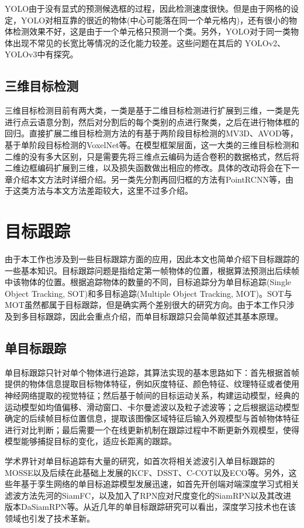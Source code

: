 YOLO由于没有显式的预测候选框的过程，因此检测速度很快。但是由于网格的设定，YOLO对相互靠的很近的物体(中心可能落在同一个单元格内)，还有很小的物体检测效果不好，这是由于一个单元格只预测一个类。另外，YOLO对于同一类物体出现不常见的长宽比等情况的泛化能力较差。这些问题在其后的 YOLOv2、YOLOv3中有探究。

\subsection{三维目标检测}
\label{3d_detection}
三维目标检测目前有两大类，一类是基于二维目标检测进行扩展到三维，一类是先进行点云语意分割，然后对分割后的每个类别的点进行聚类，之后在进行物体框的回归。直接扩展二维目标检测方法的有基于两阶段目标检测的MV3D、AVOD等，基于单阶段目标检测的VoxelNet等。在模型框架层面，这一大类的三维目标检测和二维的没有多大区别，只是需要先将三维点云编码为适合卷积的数据格式，然后将二维边框编码扩展到三维，以及损失函数做出相应的修改。具体的改动将会在下一章介绍本文方法时详细介绍。另一类先分割再回归框的方法有PointRCNN等，由于这类方法与本文方法差距较大，这里不过多介绍。


\section{目标跟踪}
\label{object_tracking}
由于本工作也涉及到一些目标跟踪方面的应用，因此本文也简单介绍下目标跟踪的一些基本知识。目标跟踪问题是指给定第一帧物体的位置，根据算法预测出后续帧中该物体的位置。根据追踪物体的数量的不同，目标追踪分为单目标追踪(Single Object Tracking, SOT)和多目标追踪(Multiple Object Tracking, MOT)。SOT与MOT虽然都属于目标跟踪，但是确实两个差别很大的研究方向。由于本工作只涉及到多目标跟踪，因此会重点介绍，而单目标跟踪只会简单叙述其基本原理。

\subsection{单目标跟踪}
\label{single_tracking}
单目标跟踪只针对单个物体进行追踪，其算法实现的基本思路如下：首先根据首帧提供的物体信息提取目标物体特征，例如灰度特征、颜色特征、纹理特征或者使用神经网络提取的视觉特征；然后基于帧间的目标运动关系，构建运动模型，经典的运动模型如均值偏移、滑动窗口、卡尔曼滤波以及粒子滤波等；之后根据运动模型确定的后续帧目标位置信息，提取该图像区域特征后输入外观模型与首帧物体特征进行对比判断；最后需要一个在线更新机制在跟踪过程中不断更新外观模型，使得模型能够捕捉目标的变化，适应长距离的跟踪。

学术界针对单目标追踪有大量的研究，如首次将相关滤波引入单目标跟踪的MOSSE\cite{bolme2010visual}以及后续在此基础上发展的KCF\cite{henriques2014high}、DSST\cite{danelljan2014accurate}、C-COT\cite{danelljan2016beyond}以及ECO\cite{danelljan2017eco}等。另外，这些年基于孪生网络的单目标追踪模型发展迅速，如首先开创端对端深度学习式相关滤波方法先河的SiamFC\cite{bertinetto2016fully}，以及加入了RPN应对尺度变化的SiamRPN\cite{li2018high}以及其改进版本DaSiamRPN\cite{zhu2018distractor}等。从近几年的单目标跟踪研究可以看出，深度学习技术也在该领域也引发了技术革新。

